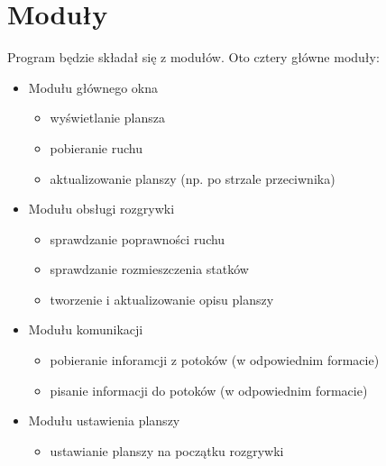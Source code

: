 \documentclass[a4paper]{article}
\begin{document}
\section{Moduły}
Program będzie składał się z modułów. Oto cztery główne moduły:
\begin{itemize}
	\item Modułu głównego okna
	\begin{itemize}
		\item wyświetlanie plansza
		\item pobieranie ruchu
		\item aktualizowanie planszy (np. po strzale przeciwnika)
	\end{itemize}
	\item Modułu obsługi rozgrywki
	\begin{itemize}
		\item sprawdzanie poprawności ruchu
		\item sprawdzanie rozmieszczenia statków
		\item tworzenie i aktualizowanie opisu planszy
	\end{itemize}
	\item Modułu komunikacji
	\begin{itemize}
		\item pobieranie inforamcji z potoków (w odpowiednim formacie)
		\item pisanie informacji do potoków (w odpowiednim formacie)
	\end{itemize}
	\item Modułu ustawienia planszy
	\begin{itemize}
		\item ustawianie planszy na początku rozgrywki
	\end{itemize}
\end{itemize}
\end{document}
